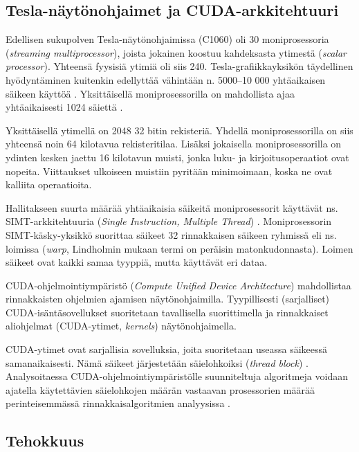 \documentclass[a4paper,11pt]{article}
\begin{document}
\subsection{Tesla-näytönohjaimet ja CUDA-arkkitehtuuri}

Edellisen sukupolven Tesla-näytönohjaimissa (C1060) oli 30 moniprosessoria (\emph{\foreignlanguage{english}{streaming multiprocessor}}), joista jokainen koostuu kahdeksasta ytimestä (\emph{\foreignlanguage{english}{scalar processor}}). Yhteensä fyysisiä ytimiä oli siis 240. Tesla-grafiikkayksikön täydellinen hyödyntäminen kuitenkin edellyttää vähintään n. 5000--10 000 yhtäaikaisen säikeen käyttöä \cite{leischner2010}. Yksittäisellä moniprosessorilla on mahdollista ajaa yhtäaikaisesti 1024 säiettä \cite{satish2009}.

Yksittäisellä ytimellä on 2048 32 bitin rekisteriä. Yhdellä moniprosessorilla on siis yhteensä noin 64 kilotavua rekisteritilaa. Lisäksi jokaisella moniprosessorilla on ydinten kesken jaettu 16 kilotavun muisti, jonka luku- ja kirjoitusoperaatiot ovat nopeita. Viittaukset ulkoiseen muistiin pyritään minimoimaan, koska ne ovat kalliita operaatioita.

Hallitakseen suurta määrää yhtäaikaisia säikeitä moniprosessorit käyttävät ns. SIMT-arkkitehtuuria (\emph{\foreignlanguage{english}{Single Instruction, Multiple Thread}}) \cite{lindholm2008}. Moniprosessorin SIMT-käsky-yksikkö suorittaa säikeet 32 rinnakkaisen säikeen ryhmissä eli ns. loimissa (\emph{\foreignlanguage{english}{warp}}, Lindholmin \cite{lindholm2008} mukaan termi on peräisin matonkudonnasta). Loimen säikeet ovat kaikki samaa tyyppiä, mutta käyttävät eri dataa.

CUDA-ohjelmointiympäristö (\emph{\foreignlanguage{english}{Compute Unified Device Architecture}}) mahdollistaa rinnakkaisten ohjelmien ajamisen näytönohjaimilla. Tyypillisesti (sarjalliset) CUDA-isäntäsovellukset suoritetaan tavallisella suorittimella ja rinnakkaiset aliohjelmat (CUDA-ytimet, \emph{\foreignlanguage{english}{kernels}}) näytönohjaimella.

CUDA-ytimet ovat sarjallisia sovelluksia, joita suoritetaan useassa säikeessä samanaikaisesti. Nämä säikeet järjestetään säielohkoiksi (\emph{\foreignlanguage{english}{thread block}}) \cite{cudaprogramming}. Analysoitaessa CUDA-ohjelmointiympäristölle suunniteltuja algoritmeja voidaan ajatella käytettävien säielohkojen määrän vastaavan prosessorien määrää perinteisemmässä rinnakkaisalgoritmien analyysissa \cite{satish2009}.

\subsection{Tehokkuus}
\end{document}
